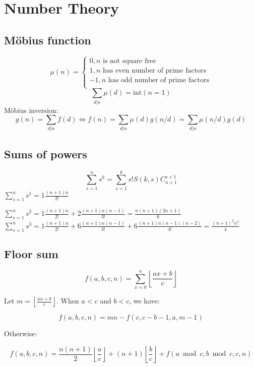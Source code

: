 \chapter{Number Theory}


\section{Möbius function}
$$\mu(n) = 
	\begin{cases}
		0, n \text{ is not square free}\\	
		1, n \text{ has even number of prime factors}\\
		-1, n \text{ has odd number of prime factors}\\
	\end{cases}
$$
$$\sum_{d | n} \mu(d) = \text{int}(n = 1)$$
Möbius inversion:
$$g(n) = \sum_{d | n} f(d) \iff f(n) = \sum_{d | n} \mu(d) g(n / d) = \sum_{d | n} \mu(n / d) g(d)$$

\section{Sums of powers}
$$\sum_{s = 1}^{n} s^k = \sum_{s = 1}^{k}s! S(k, s) C_{n + 1}^{s + 1}$$
$\sum_{s = 1}^{n} s^1 = 1\frac{(n + 1)n}{2!}$

$\sum_{s = 1}^{n} s^2 = 1\frac{(n + 1)n}{2!} + 2\frac{(n + 1)n(n-1)}{3!} = \frac{n(n+1)(2n+1)}{6}$
$\sum_{s = 1}^{n} s^3 = 1\frac{(n + 1)n}{2!} + 6\frac{(n + 1)n(n-1)}{3!} + 6\frac{(n + 1)n(n-1)(n-2)}{4!} = \frac{(n+1)^2n^2}{4}$

\section{Floor sum}

$$f(a, b, c, n) = \sum_{x=0}^n \left\lfloor\frac{ax + b}{c}\right\rfloor$$

Let $m = \left\lfloor\frac{an + b}{c}\right\rfloor$. When $a < c$ and $b < c$, we have:

$$f(a, b, c, n) = mn - f\left(c, c - b - 1, a, m - 1\right)$$

Otherwise:

$$f(a, b, c, n) = \frac{n(n + 1)}{2} \left\lfloor\frac{a}{c}\right\rfloor + (n + 1) \left\lfloor\frac{b}{c}\right\rfloor + f(a \bmod c, b \bmod c, c, n) $$

